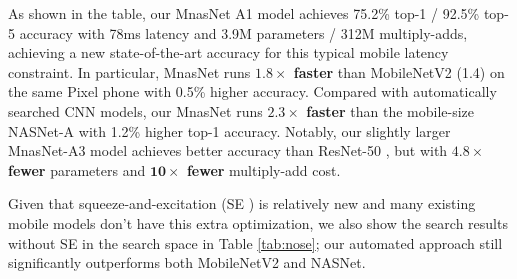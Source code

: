 \documentclass[10pt,twocolumn,letterpaper]{article}
\begin{document}
As shown in the table, our MnasNet A1 model achieves 75.2\% top-1 / 92.5\% top-5 accuracy with 78ms latency and 3.9M parameters / 312M multiply-adds, achieving a new state-of-the-art accuracy for this typical mobile latency constraint. In particular, MnasNet runs \textbf{$\mathbf{1.8\times}$ faster} than MobileNetV2 (1.4) \cite{mobilenetv218} on the same Pixel phone with 0.5\% higher accuracy.  Compared with automatically searched CNN models, our MnasNet runs \textbf{$\mathbf{2.3\times}$ faster} than the mobile-size NASNet-A \cite{nas_imagenet18} with 1.2\% higher top-1 accuracy. Notably, our slightly larger MnasNet-A3 model achieves better accuracy than ResNet-50 \cite{resnet16}, but with  \textbf{$\mathbf{4.8\times}$ fewer} parameters and \textbf{$\mathbf{10\times}$ fewer} multiply-add  cost.

%
\begin{table}
  \centering                                                                        
  \caption{                                                                         
      \textbf{Performance Study for Squeeze-and-Excitation SE~\cite{senet18}} --  denote the default MnasNet with SE in search space;   denote  MnasNet with no SE in search space. 
  }                                                                              
  \label{tab:nose}                                                         
\end{table}  
Given that squeeze-and-excitation (SE \cite{senet18}) is relatively new and many existing mobile models don't have this extra optimization, we also show the search results without SE in the search space in Table \ref{tab:nose}; our automated approach still significantly outperforms both MobileNetV2 and NASNet.
\end{document}
